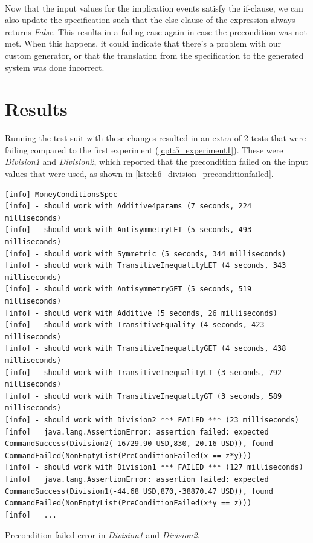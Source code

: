 \\
Now that the input values for the implication events satisfy the if-clause, we can also update the specification such that the else-clause of the expression always returns \textit{False}. This results in a failing case again in case the precondition was not met. When this happens, it could indicate that there's a problem with our custom generator, or that the translation from the specification to the generated system was done incorrect.

\section{Results}
Running the test suit with these changes resulted in an extra of 2 tests that were failing compared to the first experiment (\autoref{cpt:5_experiment1}). These were \textit{Division1} and \textit{Division2}, which reported that the precondition failed on the input values that were used, as shown in \autoref{lst:ch6_division_preconditionfailed}.
\\
\begin{sourcecode}[h!]
\begin{lstlisting}[language=Log]
[info] MoneyConditionsSpec
[info] - should work with Additive4params (7 seconds, 224 milliseconds)
[info] - should work with AntisymmetryLET (5 seconds, 493 milliseconds)
[info] - should work with Symmetric (5 seconds, 344 milliseconds)
[info] - should work with TransitiveInequalityLET (4 seconds, 343 milliseconds)
[info] - should work with AntisymmetryGET (5 seconds, 519 milliseconds)
[info] - should work with Additive (5 seconds, 26 milliseconds)
[info] - should work with TransitiveEquality (4 seconds, 423 milliseconds)
[info] - should work with TransitiveInequalityGET (4 seconds, 438 milliseconds)
[info] - should work with TransitiveInequalityLT (3 seconds, 792 milliseconds)
[info] - should work with TransitiveInequalityGT (3 seconds, 589 milliseconds)
[info] - should work with Division2 *** FAILED *** (23 milliseconds)
[info]   java.lang.AssertionError: assertion failed: expected CommandSuccess(Division2(-16729.90 USD,830,-20.16 USD)), found CommandFailed(NonEmptyList(PreConditionFailed(x == z*y)))
[info] - should work with Division1 *** FAILED *** (127 milliseconds)
[info]   java.lang.AssertionError: assertion failed: expected CommandSuccess(Division1(-44.68 USD,870,-38870.47 USD)), found CommandFailed(NonEmptyList(PreConditionFailed(x*y == z)))
[info]   ...
\end{lstlisting}
\caption{Precondition failed error in \textit{Division1} and \textit{Division2}.}
\label{lst:ch6_division_preconditionfailed}
\end{sourcecode}
